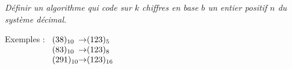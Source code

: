 
\begin{td}\label{td:codageEntier}
\em
Définir un algorithme qui code sur $k$ chiffres en base $b$ un entier positif 
$n$ du système décimal.

Exemples : 
$\begin{array}[t]{l@{\rightarrow}l}
(38)_{10} & (123)_{5} \\
(83)_{10} & (123)_{8} \\
(291)_{10} & (123)_{16}
\end{array}$
\end{td}

